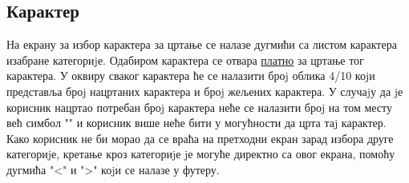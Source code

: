 \documentclass[a4paper]{article}
\begin{document}
\subsection{Карактер}
\label{character}
На екрану за избор карактера за цртање се налазе дугмићи са листом
карактера изабране категориjе. Одабиром карактера се отвара \hyperref[canvas]{платно} за
цртање тог карактера. У оквиру сваког карактера ће се налазити броj
облика 4/10 коjи представља броj нацртаних карактера и броj жељених
карактера. У случаjу да jе корисник нацртао потребан броj карактера неће
се налазити броj на том месту већ симбол "\checkmark" и корисник више неће бити у
могућности да црта таj карактер. Како корисник не би морао да се враћа на
претходни екран зарад избора друге категориjе, кретање кроз категориjе jе
могуће директно са овог екрана, помоћу дугмића "<" и ">" коjи се налазе
у футеру.
\end{document}
